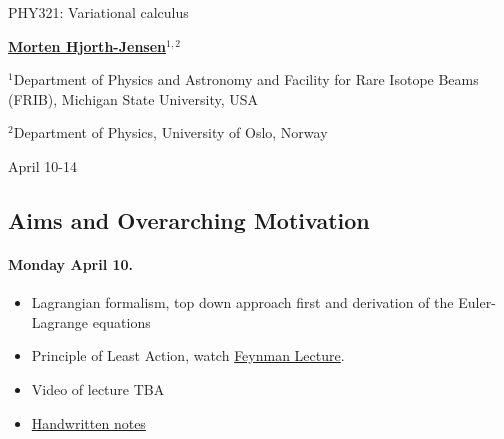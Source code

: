\documentclass[%
oneside,                 %
final,                   %
10pt]{article}
\begin{document}

\newcommand{\exercisesection}[1]{\subsection*{#1}}






\thispagestyle{empty}

\begin{center}
{\LARGE\bf
\begin{spacing}{1.25}
PHY321: Variational calculus
\end{spacing}
}
\end{center}


\begin{center}
{\bf \href{{http://mhjgit.github.io/info/doc/web/}}{Morten Hjorth-Jensen}${}^{1, 2}$} \\ [0mm]
\end{center}

\begin{center}
\centerline{{\small ${}^1$Department of Physics and Astronomy and Facility for Rare Isotope Beams (FRIB), Michigan State University, USA}}
\centerline{{\small ${}^2$Department of Physics, University of Oslo, Norway}}
\end{center}
    

\begin{center}
April 10-14
\end{center}

\vspace{1cm}


\subsection*{Aims and Overarching Motivation}

\paragraph{Monday April 10.}
\begin{itemize}
\item Lagrangian formalism, top down approach first and derivation of the Euler-Lagrange equations

\item Principle of Least Action, watch \href{{https://www.feynmanlectures.caltech.edu/II_19.html}}{Feynman Lecture}.

\item Video of lecture TBA

\item \href{{https://github.com/mhjensen/Physics321/blob/master/doc/HandWrittenNotes/Spring2023/NotesApril12.pdf}}{Handwritten notes}
\end{itemize}
\end{document}
